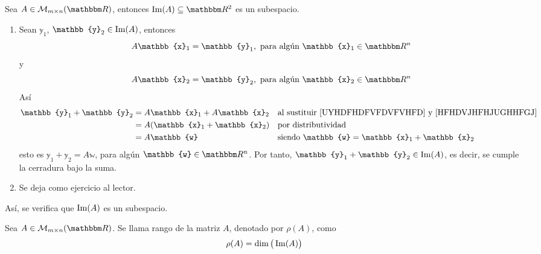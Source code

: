\begin{theorem}
    Sea $A \in \matrizmn$, entonces $\Ima(A) \subseteq \RR[2]$ es un subespacio.\\
    \demostracion
    \begin{enumerate}[label=\roman*)]
        \item Sean $\mathbb{y}_1$, $\mathbb{y}_2 \in \Ima(A)$, entonces
        \begin{equation}
            A\mathbb{x}_1 = \mathbb{y}_1, \text{ para algún } \mathbb{x}_1 \in \RR[n] \label{UYHDFHDFVFDVFVHFD}
        \end{equation}
        y
        \begin{equation}
            A\mathbb{x}_2 = \mathbb{y}_2, \text{ para algún } \mathbb{x}_2 \in \RR[n] \label{HFHDVJHFHJUGHHFGJ}
        \end{equation}
        Así
        \begin{align*}
            \mathbb{y}_1 + \mathbb{y}_2 & = A\mathbb{x}_1 + A\mathbb{x}_2 && \text{al sustituir \eqref{UYHDFHDFVFDVFVHFD} y \eqref{HFHDVJHFHJUGHHFGJ}} \\
            & = A(\mathbb{x}_1 + \mathbb{x}_2) && \text{por distributividad} \\
            & = A\mathbb{w} && \text{siendo $\mathbb{w} = \mathbb{x}_1 + \mathbb{x}_2$}
        \end{align*}
        esto es $\mathbb{y}_1 + \mathbb{y}_2 = A\mathbb{w}$, para algún $\mathbb{w} \in \RR[n]$. Por tanto, $\mathbb{y}_1 + \mathbb{y}_2 \in \Ima(A)$, es decir, se cumple la cerradura bajo la suma.
        \item Se deja como ejercicio al lector.
    \end{enumerate}
    Así, se verifica que $\operatorname{Im}(A)$ es un subespacio.
\end{theorem}

\begin{definition}
    Sea $A \in \matrizmn$. Se llama rango de la matriz $A$, denotado por $\rho(A)$, como
    $$\rho(A) = \operatorname{dim}\big(\operatorname{Im}(A)\big)$$
\end{definition}

